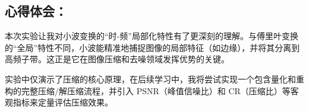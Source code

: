 \documentclass[12pt, a4paper]{article}
\begin{document}
\subsection*{\centering 心得体会：}
本次实验让我对小波变换的“时-频”局部化特性有了更深刻的理解。与傅里叶变换的“全局”特性不同，小波能精准地捕捉图像的局部特征（如边缘），并将其分离到高频子带。这正是它在图像压缩和去噪领域发挥优势的关键。

实验中仅演示了压缩的核心原理，在后续学习中，我将尝试实现一个包含量化和重构的完整压缩/解压缩流程，并引入 PSNR（峰值信噪比）和 CR（压缩比）等客观指标来定量评估压缩效果。
\end{document}
